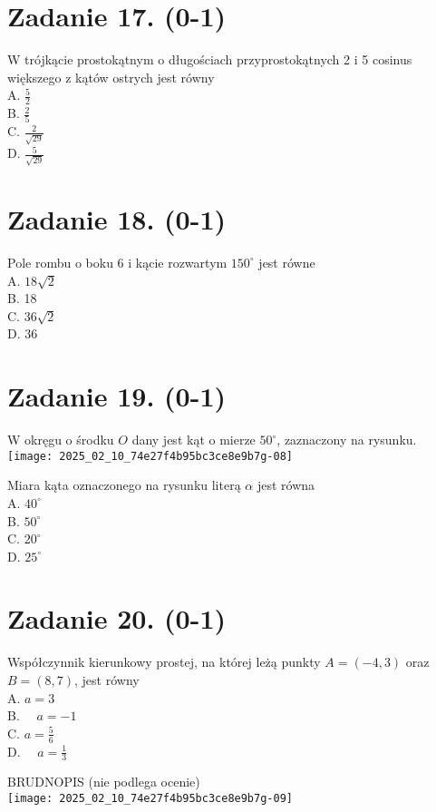 \documentclass[10pt]{article}
\begin{document}
\section*{Zadanie 17. (0-1)}
W trójkącie prostokątnym o długościach przyprostokątnych 2 i 5 cosinus większego z kątów ostrych jest równy\\
A. \(\frac{5}{2}\)\\
B. \(\frac{2}{5}\)\\
C. \(\frac{2}{\sqrt{29}}\)\\
D. \(\frac{5}{\sqrt{29}}\)

\section*{Zadanie 18. (0-1)}
Pole rombu o boku 6 i kącie rozwartym \(150^{\circ}\) jest równe\\
A. \(18 \sqrt{2}\)\\
B. 18\\
C. \(36 \sqrt{2}\)\\
D. 36

\section*{Zadanie 19. (0-1)}
W okręgu o środku \(O\) dany jest kąt o mierze \(50^{\circ}\), zaznaczony na rysunku.\\
\texttt{[image: 2025\_02\_10\_74e27f4b95bc3ce8e9b7g-08]}

Miara kąta oznaczonego na rysunku literą \(\alpha\) jest równa\\
A. \(40^{\circ}\)\\
B. \(50^{\circ}\)\\
C. \(20^{\circ}\)\\
D. \(25^{\circ}\)

\section*{Zadanie 20. (0-1)}
Współczynnik kierunkowy prostej, na której leżą punkty \(A=(-4,3)\) oraz \(B=(8,7)\), jest równy\\
A. \(a=3\)\\
B. \(\quad a=-1\)\\
C. \(a=\frac{5}{6}\)\\
D. \(\quad a=\frac{1}{3}\)

BRUDNOPIS (nie podlega ocenie)\\
\texttt{[image: 2025\_02\_10\_74e27f4b95bc3ce8e9b7g-09]}
\end{document}

